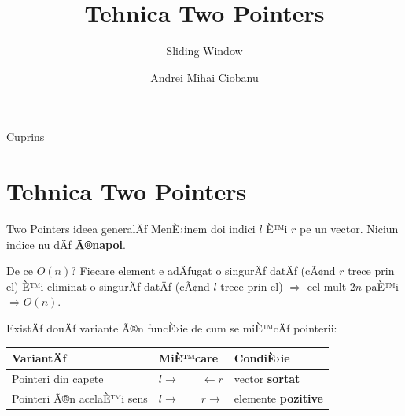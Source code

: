 ﻿\documentclass{beamer}
\title{Tehnica Two Pointers}
\subtitle{Sliding Window}
\author{Andrei Mihai Ciobanu}
\institute{Algolymp Summer School}
\date{}
\begin{document}
\begin{frame}
  \titlepage
\end{frame}

\begin{frame}{Cuprins}
  \tableofcontents[hideallsubsections]
\end{frame}

\section{Tehnica Two Pointers}

\begin{frame}{Two Pointers \textemdash{} ideea generalÄƒ}
  MenÈ›inem doi indici $l$ È™i $r$ pe un vector. Niciun indice nu dÄƒ \textbf{Ã®napoi}.

  \begin{block}{De ce $O(n)$?}
    Fiecare element e adÄƒugat o singurÄƒ datÄƒ (cÃ¢nd $r$ trece prin el)
    È™i eliminat o singurÄƒ datÄƒ (cÃ¢nd $l$ trece prin el) $\Rightarrow$ cel mult $2n$ paÈ™i $\Rightarrow O(n)$.
  \end{block}

  \smallskip
  ExistÄƒ douÄƒ variante Ã®n funcÈ›ie de cum se miÈ™cÄƒ pointerii:

  \begin{center}
  \begin{tabular}{lll}
    \toprule
    VariantÄƒ & MiÈ™care & CondiÈ›ie \\
    \midrule
    Pointeri din capete      & $l \to\qquad\leftarrow r$ & vector \textbf{sortat} \\
    Pointeri Ã®n acelaÈ™i sens & $l \to\qquad r \to$       & elemente \textbf{pozitive} \\
    \bottomrule
  \end{tabular}
  \end{center}
\end{frame}

\end{document}
